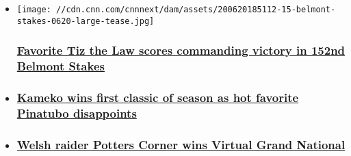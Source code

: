 \begin{itemize}
\item
  \href{/2020/06/20/us/belmont-stakes-winner-spt-trnd/index.html}{}

  \texttt{[image: //cdn.cnn.com/cnnnext/dam/assets/200620185112-15-belmont-stakes-0620-large-tease.jpg]}

  \hypertarget{favorite-tiz-the-law-scores-commanding-victory-in-152nd-belmont-stakes}{%
  \subsubsection{\texorpdfstring{\href{/2020/06/20/us/belmont-stakes-winner-spt-trnd/index.html}{Favorite
  Tiz the Law scores commanding victory in 152nd Belmont
  Stakes}}{Favorite Tiz the Law scores commanding victory in 152nd Belmont Stakes}}\label{favorite-tiz-the-law-scores-commanding-victory-in-152nd-belmont-stakes}}
\item
  \hypertarget{kameko-wins-first-classic-of-season-as-hot-favorite-pinatubo-disappoints}{%
  \subsubsection{\texorpdfstring{\href{/2020/06/06/sport/2000-guineas-kameko-wins-pinatubo-frankel/index.html}{Kameko
  wins first classic of season as hot favorite Pinatubo
  disappoints}}{Kameko wins first classic of season as hot favorite Pinatubo disappoints}}\label{kameko-wins-first-classic-of-season-as-hot-favorite-pinatubo-disappoints}}
\item
  \hypertarget{welsh-raider-potters-corner-wins-virtual-grand-national-}{%
  \subsubsection{\texorpdfstring{\href{/2020/04/04/sport/potters-corner-wins-virtual-grand-national-aintree/index.html}{Welsh
  raider Potters Corner wins Virtual Grand National
  }}{Welsh raider Potters Corner wins Virtual Grand National }}\label{welsh-raider-potters-corner-wins-virtual-grand-national-}}
\end{itemize}

